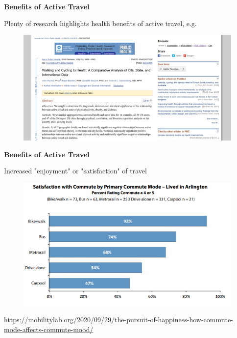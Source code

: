 \documentclass[aspectratio=169]{beamer}
\begin{document}
\begin{frame}
	
	\textbf{Benefits of Active Travel}
	
	\vspace{4mm}
	
	Plenty of research highlights health benefits of active travel, e.g. 
	
	\begin{figure}
		\centering
		\includegraphics[width=1\linewidth]{images/health_ben_active_travel.png}
	\end{figure}
	
\end{frame}




\begin{frame}
	
	\textbf{Benefits of Active Travel}
	
	\vspace{4mm}
	
	Increased "enjoyment" or "satisfaction" of travel
	
	\begin{figure}
		\centering
		\includegraphics[width=0.7\linewidth]{images/mode_satisfaction.png}
	\end{figure}

	\tiny\url{https://mobilitylab.org/2020/09/29/the-pursuit-of-happiness-how-commute-mode-affects-commute-mood/}
	
\end{frame}
\end{document}
